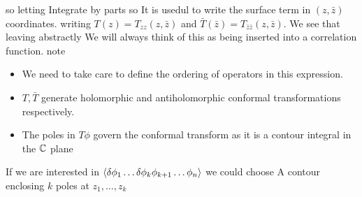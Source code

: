 \documentclass{article}
\begin{document}
so 
letting 
Integrate by parts so 
It is usedul to write the surface term in $(z,\bar{z})$ coordinates. 
writing $T(z) = T_{zz}(z,\bar{z})$ and $\bar{T}(\bar{z}) = T_{\bar{z}\bar{z}}(z,\bar{z})$. We see that 
leaving 
abstractly 
We will always think of this as being inserted into a correlation function. 
note \begin{itemize}
    \item We need to take care to define the ordering of operators in this expression. 
 \item $T,\bar{T}$ generate holomorphic and antiholomorphic conformal transformations respectively.
 \item The poles in $T\phi$ govern the conformal transform as it is a contour integral in the $\mathbb{C}$ plane 
\end{itemize}
If we are interested in $\braket{\delta \phi_1 \dots \delta \phi_k \phi_{k+1} \dots \phi_n }$ we could choose A contour enclosing $k$ poles at $z_1 , \dots, z_k$
\end{document}
